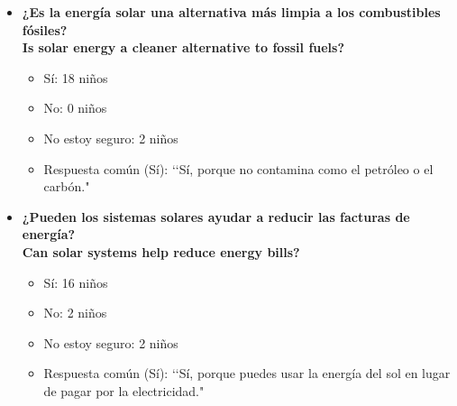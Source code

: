 \documentclass[12pt]{article}
\begin{document}
\begin{itemize}
      \item \textbf{¿Es la energía solar una alternativa más limpia a los combustibles fósiles?}\\
            \textbf{Is solar energy a cleaner alternative to fossil fuels?}
            \begin{itemize}
                  \item Sí: 18 niños
                  \item No: 0 niños
                  \item No estoy seguro: 2 niños
                  \item Respuesta común (Sí): \lq\lq Sí, porque no contamina como el petróleo o el carbón."
            \end{itemize}
            \begin{minipage}{\linewidth}
                  \centering
                  \begin{minipage}{0.5\linewidth}
                  \end{minipage}%
            \end{minipage}

      \item \textbf{¿Pueden los sistemas solares ayudar a reducir las facturas de energía?}\\
            \textbf{Can solar systems help reduce energy bills?}
            \begin{itemize}
                  \item Sí: 16 niños
                  \item No: 2 niños
                  \item No estoy seguro: 2 niños
                  \item Respuesta común (Sí): \lq\lq Sí, porque puedes usar la energía del sol en lugar de pagar por la electricidad."
            \end{itemize}
            \begin{minipage}{\linewidth}
                  \centering
                  \begin{minipage}{0.5\linewidth}
                  \end{minipage}%
            \end{minipage}


\end{itemize}
\end{document}
